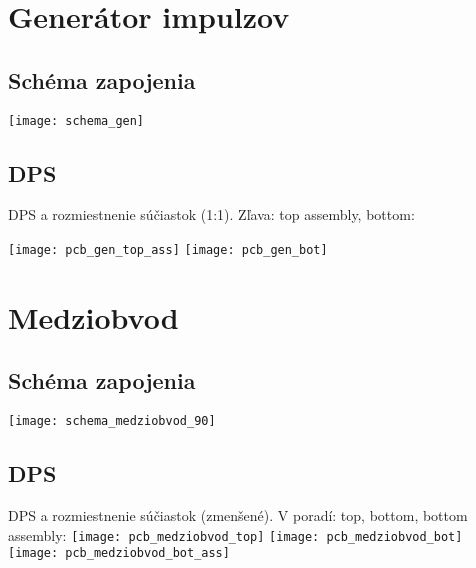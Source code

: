 \newpage
\section{Generátor impulzov} \label{sec:append_gen}

\subsection{Schéma zapojenia}
\hspace{-1.0cm}\texttt{[image: schema\_gen]}

\newpage
\subsection{DPS}
DPS a rozmiestnenie súčiastok (1:1). Zľava: top assembly, bottom:\vspace{5pt}

\texttt{[image: pcb\_gen\_top\_ass]}
\texttt{[image: pcb\_gen\_bot]}

\normalsize



\newpage
\section{Medziobvod} \label{sec:append_medziobvod}

\subsection{Schéma zapojenia}
\vspace{10pt}
\hspace{-1.0cm}\texttt{[image: schema\_medziobvod\_90]}

\newpage
\subsection{DPS}
DPS a rozmiestnenie súčiastok (zmenšené). V poradí: top, bottom, bottom assembly:\vspace{5pt}
\centering
\texttt{[image: pcb\_medziobvod\_top]}
\texttt{[image: pcb\_medziobvod\_bot]}
\texttt{[image: pcb\_medziobvod\_bot\_ass]}

\normalsize
